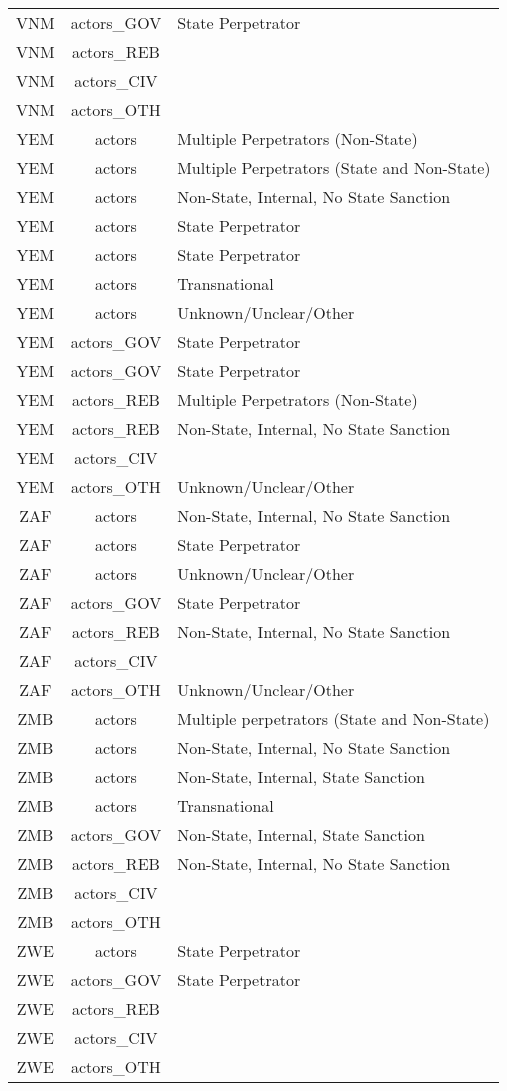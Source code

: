\documentclass[12pt]{article}
\begin{document}
\begin{center}
\begin{longtable}{|c|c|p{10cm}|}
  VNM & actors\_GOV & State Perpetrator \\ 
  VNM & actors\_REB &  \\ 
  VNM & actors\_CIV &  \\ 
  VNM & actors\_OTH &  \\ 
  YEM & actors & Multiple Perpetrators (Non-State) \\ 
  YEM & actors & Multiple Perpetrators (State and Non-State) \\ 
  YEM & actors & Non-State, Internal, No State Sanction \\ 
  YEM & actors & State Perpetrator \\ 
  YEM & actors & State Perpetrator \\ 
  YEM & actors & Transnational \\ 
  YEM & actors & Unknown/Unclear/Other \\ 
  YEM & actors\_GOV & State Perpetrator \\ 
  YEM & actors\_GOV & State Perpetrator \\ 
  YEM & actors\_REB & Multiple Perpetrators (Non-State) \\ 
  YEM & actors\_REB & Non-State, Internal, No State Sanction \\ 
  YEM & actors\_CIV &  \\ 
  YEM & actors\_OTH & Unknown/Unclear/Other \\ 
  ZAF & actors & Non-State, Internal, No State Sanction \\ 
  ZAF & actors & State Perpetrator \\ 
  ZAF & actors & Unknown/Unclear/Other \\ 
  ZAF & actors\_GOV & State Perpetrator \\ 
  ZAF & actors\_REB & Non-State, Internal, No State Sanction \\ 
  ZAF & actors\_CIV &  \\ 
  ZAF & actors\_OTH & Unknown/Unclear/Other \\ 
  ZMB & actors & Multiple perpetrators (State and Non-State) \\ 
  ZMB & actors & Non-State, Internal, No State Sanction \\ 
  ZMB & actors & Non-State, Internal, State Sanction \\ 
  ZMB & actors & Transnational \\ 
  ZMB & actors\_GOV & Non-State, Internal, State Sanction \\ 
  ZMB & actors\_REB & Non-State, Internal, No State Sanction \\ 
  ZMB & actors\_CIV &  \\ 
  ZMB & actors\_OTH &  \\ 
  ZWE & actors & State Perpetrator \\ 
  ZWE & actors\_GOV & State Perpetrator \\ 
  ZWE & actors\_REB &  \\ 
  ZWE & actors\_CIV &  \\ 
  ZWE & actors\_OTH &  \\ 
\end{longtable}
\end{center}
\end{document}
